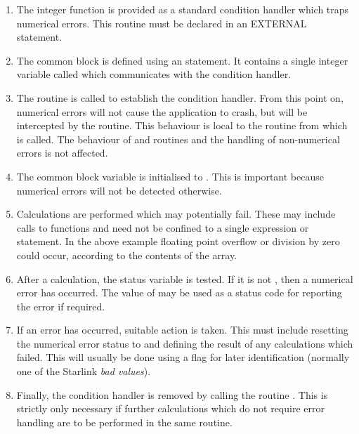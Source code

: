 \begin{enumerate}

\item The integer function  is provided as a standard
condition handler which traps numerical errors. 
This routine must be declared in an EXTERNAL statement.

\item The common block  is defined using an 
statement.
It contains a single integer variable called  which
communicates with the condition handler. 

\item The   routine  is called to
establish the condition handler.
From this point on, numerical errors will not cause the application to
crash, but will be intercepted by the  routine. 
This behaviour is local to the routine from which  is
called.
The behaviour of  and  routines and the handling of
non-numerical errors is not affected. 

\item The common block variable  is initialised to
. 
This is important because numerical errors will not be detected otherwise.

\item Calculations are performed which may potentially fail.  These may
include calls to  functions and need not be confined to a single
expression or statement. 
In the above example floating point overflow or division by zero could
occur, according to the contents of the  array. 

\item  After a calculation, the status variable  is tested.
If it is not , then a numerical error has occurred. 
The value of  may be used as a status code for reporting
the error if required. 

\item  If an error has occurred, suitable action is taken.
This must include resetting the numerical error status  to 
 and defining the result of any calculations which failed.
This will usually be done using a flag for later identification (normally
one of the Starlink {\em bad values}). 

\item Finally, the condition handler is removed by calling the 
routine .  This is strictly only necessary if further
calculations which do not require error handling are to be performed in the
same routine. 

\end{enumerate}

